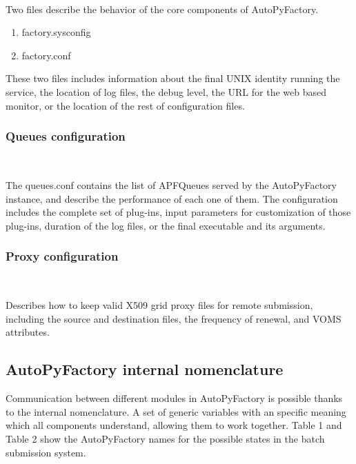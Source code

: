 \documentclass[a4paper]{jpconf}
\begin{document}
~

\noindent Two files describe the behavior of the core components of AutoPyFactory.

\begin{enumerate}
\item factory.sysconfig
\item factory.conf
\end{enumerate}

These two files includes information about the final UNIX identity running the service,
the location of log files, the debug level, the URL for the web based monitor, 
or the location of the rest of configuration files.

\subsubsection{Queues configuration}

~

\noindent The queues.conf contains the list of APFQueues served by the AutoPyFactory instance,
and describe the performance of each one of them. 
The configuration includes the complete set of plug-ins, 
input parameters for customization of those plug-ins, 
duration of the log files, 
or the final executable and its arguments.

\subsubsection{Proxy configuration}

~

\noindent Describes how to keep valid X509 grid proxy files for remote submission,
including the source and destination files, 
the frequency of renewal, 
and VOMS attributes.

\subsection{AutoPyFactory internal nomenclature}

Communication between different modules in AutoPyFactory 
is possible thanks to the internal nomenclature.
A set of generic variables with an specific meaning which all components 
understand, allowing them to work together. 
Table 1 and Table 2 show the AutoPyFactory names for the
possible states in the batch submission system. 
\end{document}
